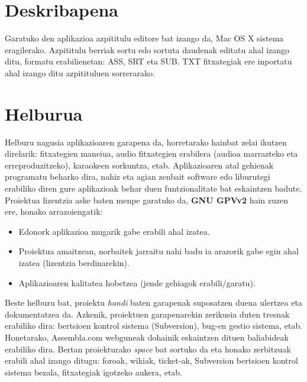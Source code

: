 
\section{Deskribapena}
Garatuko den aplikazioa azpititulu editore bat izango da, Mac OS X sistema eragilerako. Azpititulu berriak sortu edo sortuta daudenak editatu ahal izango ditu, formatu erabilienetan: ASS, SRT eta SUB. TXT fitxategiak ere inportatu ahal izango ditu azpitituluen sorrerarako.

\section{Helburua}
Helburu nagusia aplikazioaren garapena da, horretarako hainbat zelai ikutzen direlarik: fitxategien maneiua, audio fitxategien erabilera (audioa marrazteko eta erreproduzitzeko), karaokeen sorkuntza, etab.
Aplikazioaren atal gehienak programatu beharko dira, nahiz eta agian zenbait software edo liburutegi erabiliko diren gure aplikazioak behar duen funtzionalitate bat eskaintzen badute.
Proiektua lizentzia aske baten menpe garatuko da, \textbf{GNU GPVv2} hain zuzen ere, honako arrazoiengatik:
\begin{itemize}
\item Edonork aplikazioa mugarik gabe erabili ahal izatea.
\item Proiektua amaitzean, norbaitek jarraitu nahi badu ia arazorik gabe egin ahal izatea (lizentzia berdinarekin).
\item Aplikazioaren kalitatea hobetzea (jende gehiagok erabili/garatu).
\end{itemize}
Beste helburu bat, proiektu \textit{handi} baten garapenak suposatzen duena ulertzea eta dokumentatzea da.
Azkenik, proiektuen garapenarekin zerikusia duten tresnak erabiliko dira: bertsioen kontrol sistema (Subversion), bug-en gestio sistema, etab. Honetarako, Assembla.com webguneak dohainik eskaintzen dituen baliabideak erabiliko dira. Bertan proiekturako \textit{space} bat sortuko da eta honako zerbitzuak erabili ahal izango ditugu: foroak, wikiak, ticket-ak, Subversion bertsioen kontrol sistema bezala, fitxategiak igotzeko aukera, etab.

